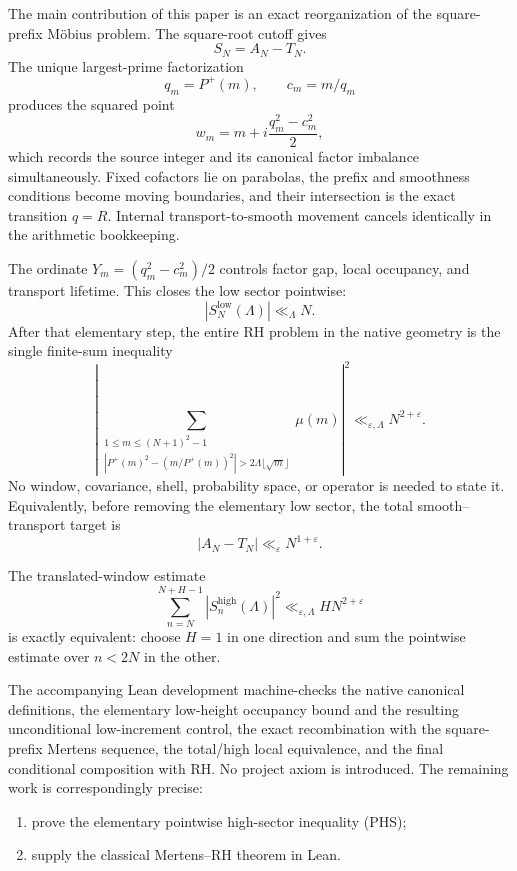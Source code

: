 \documentclass[11pt]{article}
\theoremstyle{definition}
\theoremstyle{remark}
\newcommand{\eps}{\varepsilon}
\newcommand{\Pplus}{P^{+}}
\newcommand{\1}{\mathbf{1}}
\begin{document}
The main contribution of this paper is an exact reorganization of the square-prefix M\"obius problem.  The square-root cutoff gives
\[
 S_N=A_N-T_N.
\]
The unique largest-prime factorization
\[
 q_m=\Pplus(m),\qquad c_m=m/q_m
\]
produces the squared point
\[
 w_m=m+i\frac{q_m^2-c_m^2}{2},
\]
which records the source integer and its canonical factor imbalance simultaneously.  Fixed cofactors lie on parabolas, the prefix and smoothness conditions become moving boundaries, and their intersection is the exact transition $q=R$.  Internal transport-to-smooth movement cancels identically in the arithmetic bookkeeping.

The ordinate $Y_m=(q_m^2-c_m^2)/2$ controls factor gap, local occupancy, and transport lifetime.  This closes the low sector pointwise:
\[
 |S_N^{\mathrm{low}}(\Lambda)|\ll_\Lambda N.
\]
After that elementary step, the entire RH problem in the native geometry is the single finite-sum inequality
\begin{equation}
 \boxed{
 \left|
 \sum_{\substack{1\le m\le (N+1)^2-1\\
 |\Pplus(m)^2-(m/\Pplus(m))^2|>
 2\Lambda\lfloor\sqrt m\rfloor}}
 \mu(m)
 \right|^2
 \ll_{\eps,\Lambda}N^{2+\eps}.
 }
 \tag{PHS}
 \label{eq:conclusion-PHS}
\end{equation}
No window, covariance, shell, probability space, or operator is needed to state it.  Equivalently, before removing the elementary low sector, the total smooth--transport target is
\begin{equation}
 \boxed{|A_N-T_N|\ll_\eps N^{1+\eps}.}
 \label{eq:conclusion-AT}
\end{equation}

The translated-window estimate
\[
 \sum_{n=N}^{N+H-1}|S_n^{\mathrm{high}}(\Lambda)|^2
 \ll_{\eps,\Lambda}HN^{2+\eps}
\]
is exactly equivalent: choose $H=1$ in one direction and sum the pointwise estimate over $n<2N$ in the other.

The accompanying Lean development machine-checks the native canonical definitions, the elementary low-height occupancy bound and the resulting unconditional low-increment control, the exact recombination with the square-prefix Mertens sequence, the total/high local equivalence, and the final conditional composition with RH.  No project axiom is introduced.  The remaining work is correspondingly precise:
\begin{enumerate}[leftmargin=1.7em,itemsep=0.3em]
\item prove the elementary pointwise high-sector inequality (PHS);
\item supply the classical Mertens--RH theorem in Lean.
\end{enumerate}
\end{document}
